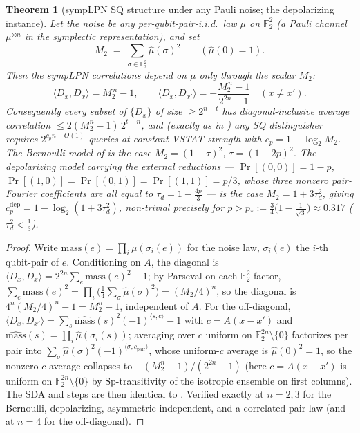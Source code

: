 \documentclass[11pt,a4paper]{article}
\theoremstyle{plain}
\newtheorem{theorem}{Theorem}[section]
\theoremstyle{definition}
\newcommand{\F}{\mathbb{F}}
\begin{document}
\begin{theorem}[sympLPN SQ structure under any Pauli noise; the depolarizing instance]
\label{thm:symplpn-depol}
Let the noise be any per-qubit-pair-i.i.d.\ law $\mu$ on $\F_2^2$ (a Pauli channel $\mu^{\otimes n}$ in the symplectic representation), and set
\[
M_2 \;=\; \sum_{\sigma\in\F_2^2}\hat\mu(\sigma)^2 \qquad (\hat\mu(0)=1).
\]
Then the sympLPN correlations depend on $\mu$ \emph{only} through the scalar $M_2$:
\[
\langle D_x, D_x \rangle = M_2^{\,n} - 1, \qquad
\langle D_x, D_{x'} \rangle = -\frac{M_2^{\,n} - 1}{2^{2n}-1}\quad(x\neq x').
\]
Consequently every subset of $\{D_x\}$ of size $\ge 2^{n-t}$ has diagonal-inclusive average correlation $\le 2(M_2^n-1)\,2^{t-n}$, and (exactly as in ) any SQ distinguisher requires $2^{c_p n-O(1)}$ queries at constant VSTAT strength with $c_p = 1-\log_2 M_2$. The Bernoulli model of  is the case $M_2=(1+\tau)^2$, $\tau=(1-2p)^2$. The \emph{depolarizing} model carrying the external reductions --- $\Pr[(0,0)]=1-p$, $\Pr[(1,0)]=\Pr[(0,1)]=\Pr[(1,1)]=p/3$, whose three nonzero pair-Fourier coefficients are all equal to $\tau_d=1-\tfrac{4p}{3}$ --- is the case $M_2=1+3\tau_d^2$, giving $c_p^{\mathrm{dep}}=1-\log_2(1+3\tau_d^2)$, non-trivial precisely for $p>p_*:=\tfrac34\bigl(1-\tfrac1{\sqrt3}\bigr)\approx0.317$ ($\tau_d^2<\tfrac13$).
\end{theorem}

\begin{proof}
Write $\mathrm{mass}(e)=\prod_i\mu(\sigma_i(e))$ for the noise law, $\sigma_i(e)$ the $i$-th qubit-pair of $e$. Conditioning on $A$, the diagonal is $\langle D_x,D_x\rangle=2^{2n}\sum_e\mathrm{mass}(e)^2-1$; by Parseval on each $\F_2^2$ factor, $\sum_e\mathrm{mass}(e)^2=\prod_i\bigl(\tfrac14\sum_\sigma\hat\mu(\sigma)^2\bigr)=(M_2/4)^n$, so the diagonal is $4^n(M_2/4)^n-1=M_2^n-1$, independent of $A$. For the off-diagonal, $\langle D_x,D_{x'}\rangle=\sum_s\widehat{\mathrm{mass}}(s)^2(-1)^{\langle s,c\rangle}-1$ with $c=A(x{-}x')$ and $\widehat{\mathrm{mass}}(s)=\prod_i\hat\mu(\sigma_i(s))$; averaging over $c$ uniform on $\F_2^{2n}\setminus\{0\}$ factorizes per pair into $\sum_\sigma\hat\mu(\sigma)^2(-1)^{\langle\sigma,c_{\mathrm{pair}}\rangle}$, whose uniform-$c$ average is $\hat\mu(0)^2=1$, so the nonzero-$c$ average collapses to $-(M_2^n-1)/(2^{2n}-1)$ (here $c=A(x{-}x')$ is uniform on $\F_2^{2n}\setminus\{0\}$ by $\mathrm{Sp}$-transitivity of the isotropic ensemble on first columns). The SDA and  steps are then identical to . Verified exactly at $n=2,3$ for the Bernoulli, depolarizing, asymmetric-independent, and a correlated pair law (and at $n=4$ for the off-diagonal).
\end{proof}
\end{document}
